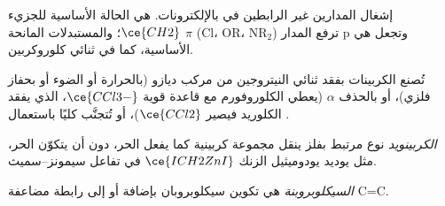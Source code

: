 \begin{omfigure}

{\small إشغال المدارين غير الرابطين في  بالإلكترونات.  هي الحالة الأساسية للجزيء $\ce{CH2}$؛ والمستبدلات المانحة $\pi$ (Cl، OR، $\mathrm{NR_2}$) ترفع
المدار p وتجعل  هي الأساسية، كما في ثنائي كلوروكربين.}
\end{omfigure}

تُصنع الكربينات بفقد ثنائي النيتروجين من مركب ديازو (بالحرارة أو الضوء
أو بحفاز فلزي)، أو بالحذف $\alpha$ (يعطي الكلوروفورم مع قاعدة قوية
$\ce{CCl3-}$، الذي يفقد الكلوريد فيصير $\ce{CCl2}$)، أو تُتجنَّب كليًا باستعمال
.

\begin{definition}[الكربينويدات]\label{def:b3:radicals-carbenes:carbenoid}
\emph{الكربينويد} نوع مرتبط بفلز ينقل
مجموعة كربينية كما يفعل  الحر، دون أن يتكوّن  الحر،
مثل يوديد يودوميثيل الزنك $\ce{ICH2ZnI}$ في تفاعل سيمونز--سميث.
\end{definition}

\begin{definition}[السيكلوبروبنة]\label{def:b3:radicals-carbenes:cyclopropanation}
\emph{السيكلوبروبنة} هي تكوين
سيكلوبروبان بإضافة  أو  إلى رابطة مضاعفة C=C.
\end{definition}

